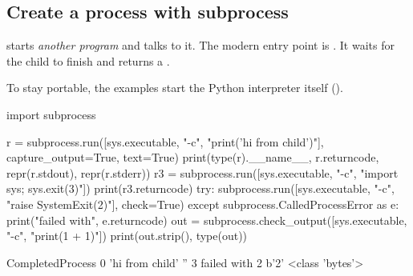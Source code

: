 \subsection{Create a process with subprocess}

 starts \emph{another program} and talks to it. The modern entry point is
. It waits for the child to finish and returns a .

\begin{center}
\end{center}

To stay portable, the examples start the Python interpreter itself ().

\begin{pycode}
import subprocess

r = subprocess.run([sys.executable, "-c", "print('hi from child')"],
                   capture_output=True, text=True)
print(type(r).__name__, r.returncode, repr(r.stdout), repr(r.stderr))
r3 = subprocess.run([sys.executable, "-c", "import sys; sys.exit(3)"])
print(r3.returncode)
try:
    subprocess.run([sys.executable, "-c", "raise SystemExit(2)"], check=True)
except subprocess.CalledProcessError as e:
    print("failed with", e.returncode)
out = subprocess.check_output([sys.executable, "-c", "print(1 + 1)"])
print(out.strip(), type(out))
\end{pycode}
\begin{rawcode}
CompletedProcess 0 'hi from child\n' ''
3
failed with 2
b'2' <class 'bytes'>
\end{rawcode}

